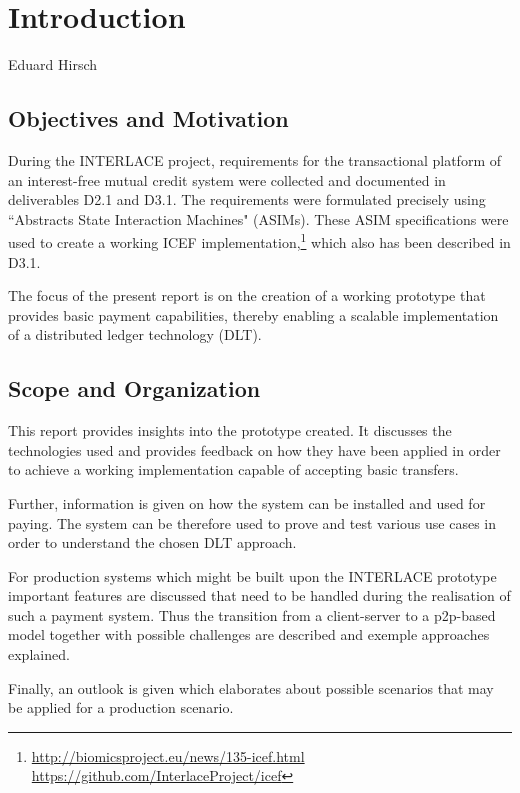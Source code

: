 \chapter{Introduction}
\label{ch:Introduction}

\vspace{-1cm}
\begin{center}
Eduard Hirsch
\end{center}


\section{Objectives and Motivation}

During the INTERLACE project, requirements for the transactional platform of an interest-free mutual credit system were collected and documented in deliverables D2.1\cite{INTERLACE_D21} and D3.1\cite{INTERLACE_D31}. The requirements were formulated precisely using ``Abstracts State Interaction Machines" (ASIMs). These ASIM specifications were used to create a working ICEF implementation,\footnote{\url{http://biomicsproject.eu/news/135-icef.html}\\ \url{https://github.com/InterlaceProject/icef}} which also has been described in D3.1.

The focus of the present report is on the creation of a working prototype that provides basic payment capabilities, thereby enabling a scalable implementation of a distributed ledger technology (DLT).

\section{Scope and Organization}
This report provides insights into the prototype created. It discusses the technologies used and provides feedback on how they have been applied in order to achieve a working implementation capable of accepting basic transfers.

Further, information is given on how the system can be installed and used for paying. The system can be therefore used to prove and test various use cases in order to understand the chosen DLT approach.

For production systems which might be built upon the INTERLACE prototype important features are discussed that need to be handled during the realisation of such a payment system. Thus the transition from a client-server to a p2p-based model together with possible challenges are described and exemple approaches explained.

Finally, an outlook is given which elaborates about possible scenarios that may be applied for a production scenario.

\newpage

